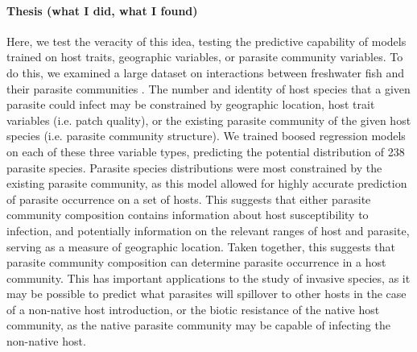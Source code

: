 \documentclass[12pt]{article}
\begin{document}
  
 \paragraph{Thesis (what I did, what I found)}
    
  Here, we test the veracity of this idea, testing the predictive capability of models trained on host traits, geographic variables, or parasite community variables. To do this, we examined a large dataset on interactions between freshwater fish and their parasite communities \cite{strona2012}. The number and identity of host species that a given parasite could infect may be constrained by geographic location, host trait variables (i.e. patch quality), or the existing parasite community of the given host species (i.e. parasite community structure). We trained boosed regression models on each of these three variable types, predicting the potential distribution of 238 parasite species. Parasite species distributions were most constrained by the existing parasite community, as this model allowed for highly accurate prediction of parasite occurrence on a set of hosts. This suggests that either parasite community composition contains information about host susceptibility to infection, and potentially information on the relevant ranges of host and parasite, serving as a measure of geographic location. Taken together, this suggests that parasite community composition can determine parasite occurrence in a host community. This has important applications to the study of invasive species, as it may be possible to predict what parasites will spillover to other hosts in the case of a non-native host introduction, or the biotic resistance of the native host community, as the native parasite community may be capable of infecting the non-native host. 
  
  
 
\end{document}
